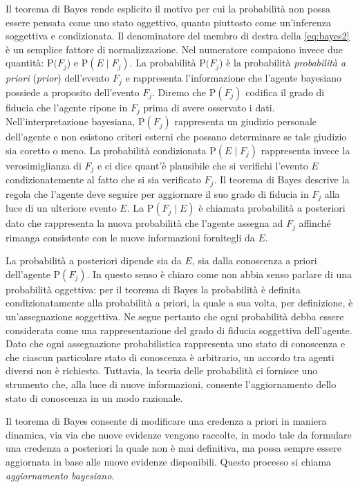 \documentclass[
  11pt,
]{krantz}
\theoremstyle{definition}
\theoremstyle{definition}
\theoremstyle{definition}
\theoremstyle{definition}
\theoremstyle{remark}
\begin{document}
Il teorema di Bayes rende esplicito il motivo per cui la probabilità non possa essere pensata come uno stato oggettivo, quanto piuttosto come un'inferenza soggettiva e condizionata. Il denominatore del membro di destra della \eqref{eq:bayes2} è un semplice fattore di normalizzazione. Nel numeratore compaiono invece due quantità: \({\mbox{P}}(F_j\)) e \({\mbox{P}}(E \mid F_j)\). La probabilità \({\mbox{P}}(F_j\)) è la probabilità \emph{probabilità a priori} (\emph{prior}) dell'evento \(F_j\) e rappresenta l'informazione che l'agente bayesiano possiede a proposito dell'evento \(F_j\). Diremo che \({\mbox{P}}(F_j)\) codifica il grado di fiducia che l'agente ripone in \(F_j\) prima di avere osservato i dati. Nell'interpretazione bayesiana, \({\mbox{P}}(F_j)\) rappresenta un giudizio personale dell'agente e non esistono criteri esterni che possano determinare se tale giudizio sia coretto o meno. La probabilità condizionata \({\mbox{P}}(E \mid F_j)\) rappresenta invece la verosimiglianza di \(F_j\) e ci dice quant'è plausibile che si verifichi l'evento \(E\) condizionatemente al fatto che si sia verificato \(F_j\). Il teorema di Bayes descrive la regola che l'agente deve seguire per aggiornare il suo grado di fiducia in \(F_j\) alla luce di un ulteriore evento \(E\). La \({\mbox{P}}(F_j \mid E)\) è chiamata probabilità a posteriori dato che rappresenta la nuova probabilità che l'agente assegna ad \(F_j\) affinché rimanga consistente con le nuove informazioni fornitegli da \(E\).

La probabilità a posteriori dipende sia da \(E\), sia dalla conoscenza a priori dell'agente \({\mbox{P}}(F_j)\). In questo senso è chiaro come non abbia senso parlare di una probabilità oggettiva: per il teorema di Bayes la probabilità è definita condizionatamente alla probabilità a priori, la quale a sua volta, per definizione, è un'assegnazione soggettiva. Ne segue pertanto che ogni probabilità debba essere considerata come una rappresentazione del grado di fiducia soggettiva dell'agente. Dato che ogni assegnazione probabilistica rappresenta uno stato di conoscenza e che ciascun particolare stato di conoscenza è arbitrario, un accordo tra agenti diversi non è richiesto. Tuttavia, la teoria delle probabilità ci fornisce uno strumento che, alla luce di nuove informazioni, consente l'aggiornamento dello stato di conoscenza in un modo razionale.

Il teorema di Bayes consente di modificare una credenza a priori in maniera dinamica, via via che nuove evidenze vengono raccolte, in modo tale da formulare una credenza a posteriori la quale non è mai definitiva, ma possa sempre essere aggiornata in base alle nuove evidenze disponibili. Questo processo si chiama \emph{aggiornamento bayesiano}.
\end{document}
